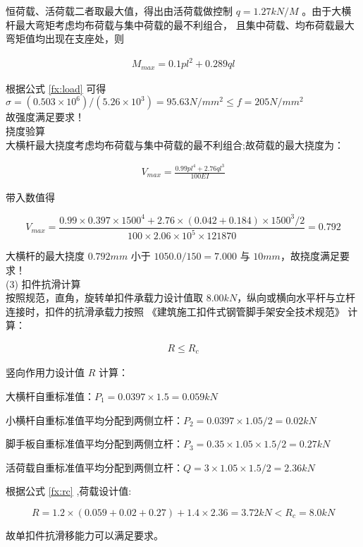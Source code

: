 恒荷载、活荷载二者取最大值，得出由活荷载做控制 $q=1.27 kN/M$ 。由于大横杆最大弯矩考虑均布荷载与集中荷载的最不利组合，
且集中荷载、均布荷载最大弯矩值均出现在支座处，则

\begin{align}
    M_{max}=0.1pl^2+0.289ql
\end{align}

根据公式 \ref{fx:load} 可得 $\sigma =(0.503\times 10^6)/(5.26\times 10^3)=95.63 N/mm^2 \leq f=205 N/mm^2$\\
故强度满足要求！\\

 挠度验算\\

大横杆最大挠度考虑均布荷载与集中荷载的最不利组合;故荷载的最大挠度为：

\begin{align}
    V_{max}=\frac{0.99pl^4+2.76ql^3}{100EI}
\end{align}

带入数值得

$$V_{max}=\frac{0.99\times 0.397\times 1500^4+2.76\times (0.042+0.184)\times 1500^3/2}{100\times 2.06\times 10^5\times 121870}=0.792$$

大横杆的最大挠度 $0.792mm$ 小于 $1050.0/150=7.000$ 与 $10mm$，故挠度满足要求！ \\

(3) 扣件抗滑计算\\

按照规范，直角，旋转单扣件承载力设计值取 $8.00kN$，纵向或横向水平杆与立杆连接时，扣件的抗滑承载力按照 《建筑施工扣件式钢管脚手架安全技术规范》 计算：

\begin{align}
    \label{fx:rc}
    R \leq R_c
\end{align}

竖向作用力设计值 $R$ 计算：

 大横杆自重标准值：$P_1=0.0397×1.5=0.059kN$

 小横杆自重标准值平均分配到两侧立杆：$P_2=0.0397×1.05/2=0.02kN$ 

 脚手板自重标准值平均分配到两侧立杆：$P_3=0.35×1.05×1.5/2=0.27kN$ 

 活荷载自重标准值平均分配到两侧立杆：$Q=3×1.05×1.5/2=2.36kN$

根据公式 \ref{fx:rc} ,荷载设计值:

$$R=1.2×(0.059+0.02+0.27)+1.4×2.36=3.72kN<R_c=8.0kN$$

故单扣件抗滑移能力可以满足要求。\\

